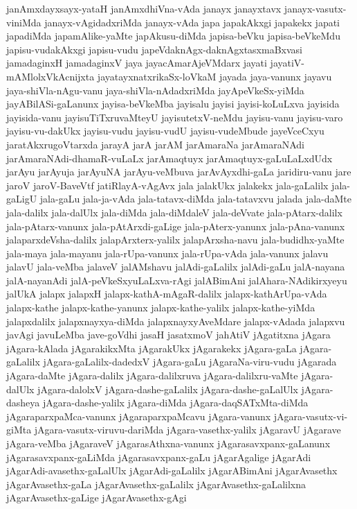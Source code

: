 {janAmxdayxsayx-yataH
janAmxdhiVna-vAda
janayx
janayxtavx
janayx-vasutx-viniMda
janayx-vAgidadxriMda
janayx-vAda
japa
japakAkxgi
japakekx
japati
japadiMda
japamAlike-yaMte
japAkusu-diMda
japisa-beVku
japisa-beVkeMdu
japisu-vudakAkxgi
japisu-vudu
japeVdaknAgx-daknAgxtasxmaBxvasi
jamadaginxH
jamadaginxV
jaya
jayacAmarAjeVMdarx
jayati
jayatiV-mAMlolxVkAcnijxta
jayatayxnatxrikaSx-loVkaM
jayada
jaya-vanunx
jayavu
jaya-shiVla-nAgu-vanu
jaya-shiVla-nAdadxriMda
jayApeVkeSx-yiMda
jayABilASi-gaLanunx
jayisa-beVkeMba
jayisalu
jayisi
jayisi-koLuLxva
jayisida
jayisida-vanu
jayisuTiTxruvaMteyU
jayisutetxV-neMdu
jayisu-vanu
jayisu-varo
jayisu-vu-dakUkx
jayisu-vudu
jayisu-vudU
jayisu-vudeMbude
jayeVceCxyu
jaratAkxrugoVtarxda
jarayA
jarA
jarAM
jarAmaraNa
jarAmaraNAdi
jarAmaraNAdi-dhamaR-vuLaLx
jarAmaqtuyx
jarAmaqtuyx-gaLuLaLxdUdx
jarAyu
jarAyuja
jarAyuNA
jarAyu-veMbuva
jarAvAyxdhi-gaLa
jaridiru-vanu
jare
jaroV
jaroV-BaveVtf
jatiRlayA-vAgAvx
jala
jalakUkx
jalakekx
jala-gaLalilx
jala-gaLigU
jala-gaLu
jala-ja-vAda
jala-tatavx-diMda
jala-tatavxvu
jalada
jala-daMte
jala-dalilx
jala-dalUlx
jala-diMda
jala-diMdaleV
jala-deVvate
jala-pAtarx-dalilx
jala-pAtarx-vanunx
jala-pAtArxdi-gaLige
jala-pAterx-yanunx
jala-pAna-vanunx
jalaparxdeVsha-dalilx
jalapArxterx-yalilx
jalapArxsha-navu
jala-budidhx-yaMte
jala-maya
jala-mayanu
jala-rUpa-vanunx
jala-rUpa-vAda
jala-vanunx
jalavu
jalavU
jala-veMba
jalaveV
jalAMshavu
jalAdi-gaLalilx
jalAdi-gaLu
jalA-nayana
jalA-nayanAdi
jalA-peVkeSxyuLaLxva-rAgi
jalABimAni
jalAhara-NAdikirxyeyu
jalUkA
jalapx
jalapxH
jalapx-kathA-mAgaR-dalilx
jalapx-kathArUpa-vAda
jalapx-kathe
jalapx-kathe-yanunx
jalapx-kathe-yalilx
jalapx-kathe-yiMda
jalapxdalilx
jalapxnayxya-diMda
jalapxnayxyAveMdare
jalapx-vAdada
jalapxvu
javAgi
javuLeMba
jave-goVdhi
jasaH
jasatxmoV
jahAtiV
jAgatitxna
jAgara
jAgara-kAlada
jAgarakikxMta
jAgarakUkx
jAgarakekx
jAgara-gaLa
jAgara-gaLalilx
jAgara-gaLalilx-dadedxV
jAgara-gaLu
jAgaraNa-viru-vudu
jAgarada
jAgara-daMte
jAgara-dalilx
jAgara-dalilxruva
jAgara-dalilxru-vaMte
jAgara-dalUlx
jAgara-dalolxV
jAgara-dashe-gaLalilx
jAgara-dashe-gaLalUlx
jAgara-dasheya
jAgara-dashe-yalilx
jAgara-diMda
jAgara-daqSATxMta-diMda
jAgaraparxpaMca-vanunx
jAgaraparxpaMcavu
jAgara-vanunx
jAgara-vasutx-vi-giMta
jAgara-vasutx-viruvu-dariMda
jAgara-vasethx-yalilx
jAgaravU
jAgarave
jAgara-veMba
jAgaraveV
jAgarasAthxna-vanunx
jAgarasavxpanx-gaLanunx
jAgarasavxpanx-gaLiMda
jAgarasavxpanx-gaLu
jAgarAgalige
jAgarAdi
jAgarAdi-avasethx-gaLalUlx
jAgarAdi-gaLalilx
jAgarABimAni
jAgarAvasethx
jAgarAvasethx-gaLa
jAgarAvasethx-gaLalilx
jAgarAvasethx-gaLalilxna
jAgarAvasethx-gaLige
jAgarAvasethx-gAgi
}
